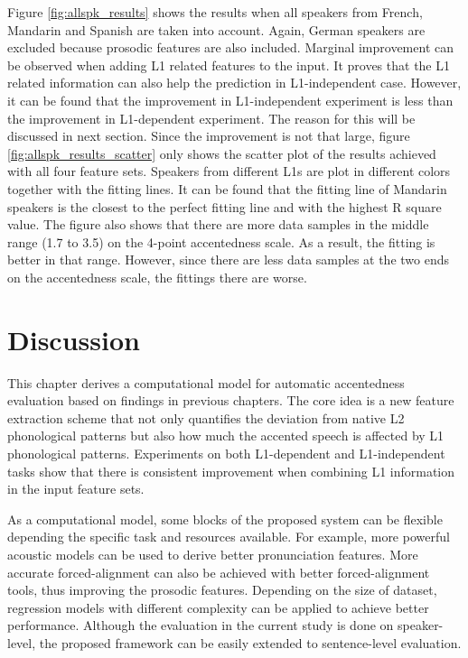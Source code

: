 Figure \ref{fig:allspk_results} shows the results when all speakers from French, Mandarin and Spanish are taken into account. Again, German speakers are excluded because prosodic features are also included. Marginal improvement can be observed when adding L1 related features to the input. It proves that the L1 related information can also help the prediction in L1-independent case. However, it can be found that the improvement in L1-independent experiment is less than the improvement in L1-dependent experiment. The reason for this will be discussed in next section. Since the improvement is not that large, figure \ref{fig:allspk_results_scatter} only shows the scatter plot of the results achieved with all four feature sets. Speakers from different L1s are plot in different colors together with the fitting lines. It can be found that the fitting line of Mandarin speakers is the closest to the perfect fitting line and with the highest R square value. The figure also shows that there are more data samples in the middle range (1.7 to 3.5) on the 4-point accentedness scale. As a result, the fitting is better in that range. However, since there are less data samples at the two ends on the accentedness scale, the fittings there are worse.

\section{Discussion}

This chapter derives a computational model for automatic accentedness evaluation based on findings in previous chapters. The core idea is a new feature extraction scheme that not only quantifies the deviation from native L2 phonological patterns but also how much the accented speech is affected by L1 phonological patterns. Experiments on both L1-dependent and L1-independent tasks show that there is consistent improvement when combining L1 information in the input feature sets.

As a computational model, some blocks of the proposed system can be flexible depending the specific task and resources available. For example, more powerful acoustic models can be used to derive better pronunciation features. More accurate forced-alignment can also be achieved with better forced-alignment tools, thus improving the prosodic features. Depending on the size of dataset, regression models with different complexity can be applied to achieve better performance. Although the evaluation in the current study is done on speaker-level, the proposed framework can be easily extended to sentence-level evaluation.

